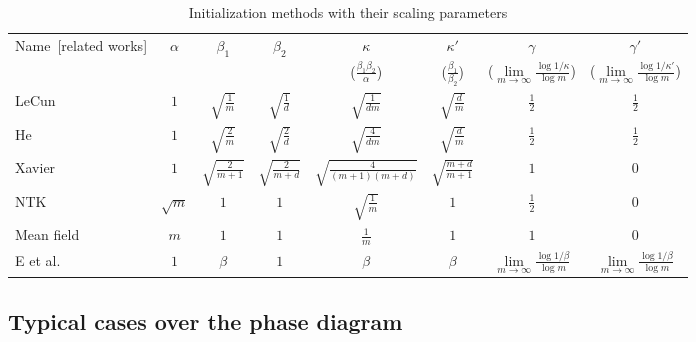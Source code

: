 \documentclass{article}
\begin{document}
\begin{table}[ht]\footnotesize
    \centering
    \begin{tabularx}{\textwidth}{lccccccc}
        \toprule
        \multirow{2}{*}{Name~\scriptsize{[{related works}]}} & \multirow{2}{*}{$\alpha$} &  \multirow{2}{*}{$\beta_1$} &  \multirow{2}{*}{$\beta_2$} & $\kappa$ & $\kappa'$ & $\gamma$ & $\gamma'$ \\
         & & & &($\scriptscriptstyle\frac{\beta_1\beta_2}{\alpha}$) & ($\scriptscriptstyle\frac{\beta_1}{\beta_2}$) & ($\scriptscriptstyle\lim\limits_{m\to\infty}\frac{\log1/\kappa}{\log m}$) & ($\scriptscriptstyle\lim\limits_{m\to\infty}\frac{\log 1/\kappa'}{\log m}$)\\
        \midrule
        LeCun~\scriptsize{\cite{lecun2012efficient}} & $1$ & $\sqrt{\frac{1}{m}}$ & $\sqrt{\frac{1}{d}}$ & $\sqrt{\frac{1}{dm}}$ & $\sqrt{\frac{d}{m}}$ & $\frac{1}{2}$ & $\frac{1}{2}$ \\
        He~\scriptsize{\cite{he2015delving}} & $1$ & $\sqrt{\frac{2}{m}}$ & $\sqrt{\frac{2}{d}}$ & $\sqrt{\frac{4}{dm}}$ & $\sqrt{\frac{d}{m}}$ & $\frac{1}{2}$ & $\frac{1}{2}$ \\
        Xavier~\scriptsize{\cite{glorot2010understanding}} & $1$ & $\sqrt{\frac{2}{m+1}}$ & $\sqrt{\frac{2}{m+d}}$ & $\sqrt{\frac{4}{(m+1)(m+d)}}$ & $\sqrt{\frac{m+d}{m+1}}$ & $1$ & $0$ \\
        NTK~\scriptsize{\cite{jacot_neural_2018}} & $\sqrt{m}$ & $1$ & $1$ & $\sqrt{\frac{1}{m}}$ & $1$ & $\frac{1}{2}$ & $0$\\
        Mean field~\scriptsize{\cite{mei_mean_2018,sirignano_mean_2020,rotskoff_parameters_2018}} & $m$ & $1$ & $1$ & $\frac{1}{m}$ & $1$ & $1$ & $0$ \\
        E et al.~\scriptsize{\cite{e2020comparative}} & $1$ & $\beta$ & $1$ & $\beta$ & $\beta$ & $\scriptscriptstyle\lim\limits_{m\to\infty}\frac{\log 1/\beta}{\log m}$ & $\scriptscriptstyle\lim\limits_{m\to\infty}\frac{\log 1/\beta}{\log m}$ \\
        \bottomrule
    \end{tabularx}
    \caption{Initialization methods with their scaling parameters}
    \label{tab..InitializationMethods}
\end{table}

\subsection{Typical cases over the phase diagram}
\end{document}
